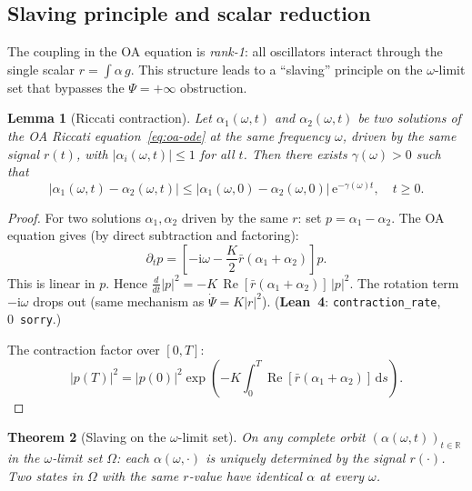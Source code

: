 \documentclass[11pt,a4paper]{article}
\newtheorem{theorem}{Theorem}[section]
\newtheorem{lemma}[theorem]{Lemma}
\theoremstyle{definition}
\DeclareMathOperator{\re}{Re}
\newcommand{\R}{\mathbb{R}}
\begin{document}
\subsection{Slaving principle and scalar reduction}\label{sec:slaving}

The coupling in the OA equation is \emph{rank-1}: all oscillators interact through the single scalar $r = \int\alpha\,g$. This structure leads to a ``slaving'' principle on the $\omega$-limit set that bypasses the $\Psi = +\infty$ obstruction.

\begin{lemma}[Riccati contraction]\label{lem:riccati-contraction}
Let $\alpha_1(\omega, t)$ and $\alpha_2(\omega, t)$ be two solutions of the OA Riccati equation~\eqref{eq:oa-ode} at the same frequency $\omega$, driven by the \emph{same} signal $r(t)$, with $|\alpha_i(\omega, t)| \leq 1$ for all $t$. Then there exists $\gamma(\omega) > 0$ such that
\[
|\alpha_1(\omega, t) - \alpha_2(\omega, t)| \leq |\alpha_1(\omega, 0) - \alpha_2(\omega, 0)|\, \mathrm{e}^{-\gamma(\omega) t}, \quad t \geq 0.
\]
\end{lemma}

\begin{proof}
For two solutions $\alpha_1, \alpha_2$ driven by the same $r$: set $p = \alpha_1 - \alpha_2$. The OA equation gives (by direct subtraction and factoring):
\[
\partial_t p = \left[-\mathrm{i}\omega - \frac{K}{2}\bar{r}(\alpha_1 + \alpha_2)\right] p.
\]
This is linear in $p$. Hence $\frac{d}{dt}|p|^2 = -K\,\re[\bar{r}(\alpha_1+\alpha_2)]\,|p|^2$. The rotation term $-\mathrm{i}\omega$ drops out (same mechanism as $\dot\Psi = K|r|^2$). (\textbf{Lean~4}: \texttt{contraction\_rate}, 0~\texttt{sorry}.)

The contraction factor over $[0,T]$:
\begin{equation}\label{eq:contraction-factor}
|p(T)|^2 = |p(0)|^2\exp\!\left(-K\int_0^T \re[\bar{r}(\alpha_1+\alpha_2)]\,\mathrm{d}s\right).
\end{equation}
\end{proof}

\begin{theorem}[Slaving on the $\omega$-limit set]\label{thm:slaving}
On any complete orbit $(\alpha(\omega, t))_{t \in \R}$ in the $\omega$-limit set $\Omega$: each $\alpha(\omega, \cdot)$ is uniquely determined by the signal $r(\cdot)$. Two states in $\Omega$ with the same $r$-value have identical $\alpha$ at every $\omega$.
\end{theorem}
\end{document}
